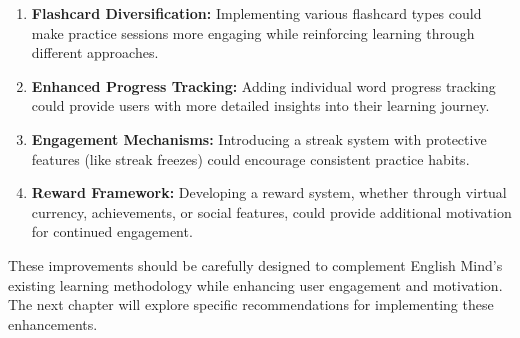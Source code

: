 \begin{enumerate}
    \item \textbf{Flashcard Diversification:} Implementing various flashcard types could make practice sessions more engaging while reinforcing learning through different approaches.
    
    \item \textbf{Enhanced Progress Tracking:} Adding individual word progress tracking could provide users with more detailed insights into their learning journey.
    
    \item \textbf{Engagement Mechanisms:} Introducing a streak system with protective features (like streak freezes) could encourage consistent practice habits.
    
    \item \textbf{Reward Framework:} Developing a reward system, whether through virtual currency, achievements, or social features, could provide additional motivation for continued engagement.
\end{enumerate}

These improvements should be carefully designed to complement English Mind's existing learning methodology while enhancing user engagement and motivation. The next chapter will explore specific recommendations for implementing these enhancements.